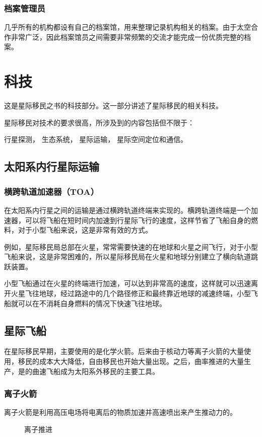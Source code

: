 \documentclass[letterpaper,10pt]{sphinxmanual}
\begin{document}
\subsubsection{档案管理员}
\label{profession:id45}
几乎所有的机构都设有自己的档案馆，用来整理记录机构相关的档案。由于太空合作非常广泛，因此档案馆员之间需要非常频繁的交流才能完成一份优质完整的档案。


\section{科技}
\label{tech::doc}\label{tech:id1}
这是星际移民之书的科技部分。这一部分讲述了星际移民的相关科技。

星际移民对技术的要求很高，所涉及到的内容包括但不限于：

行星探测，
生态系统，
星际运输，
星际空间定位和通信。


\subsection{太阳系内行星际运输}
\label{tech:id2}

\subsubsection{横跨轨道加速器（TOA）}
\label{tech:toa}\label{tech:index-1}
在太阳系内行星之间的运输是通过横跨轨道终端来实现的。横跨轨道终端是一个加速器，可以将飞船在短时间内加速到行星际飞行的速度，这样节省了飞船自身的燃料，对于小型飞船来说，这是非常有效的方式。

例如，星际移民局总部在火星，常常需要快速的在地球和火星之间飞行，对于小型飞船来说，这是非常困难的，所以星际移民局在火星和地球分别建立了横向轨道跳跃装置。

小型飞船通过在火星的终端进行加速，可以达到非常高的速度，这样就可以迅速离开火星飞往地球，经过路途中的几个路径修正和最终靠近地球的减速终端，小型飞船就可以在不消耗自身燃料的情况下快速飞往地球。


\subsection{星际飞船}
\label{tech:id3}
在星际移民早期，主要使用的是化学火箭。后来由于核动力等离子火箭的大量使用，移民的成本大大降低，自由移民也开始大量出现。之后，曲率推进的大量生产，是的曲速飞船成为太阳系外移民的主要工具。


\subsubsection{离子火箭}
\label{tech:id4}
离子火箭是利用高压电场将电离后的物质加速并高速喷出来产生推动力的。
\begin{figure}[htbp]
\centering
\capstart
\caption{离子推进}\end{figure}
\end{document}

